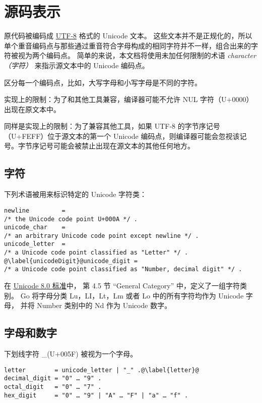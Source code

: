 
\chapter{源码表示}
原代码被编码成 \href{http://en.wikipedia.org/wiki/UTF-8}{UTF-8} 格式的 Unicode 文本。
这些文本并不是正规化的，所以单个重音编码点与那些通过重音符合字母构成的相同字符并不一样，组合出来的字符被视为两个编码点。
简单的来说，本文档将使用未加任何限制的术语 \emph{character（字符）} 来指示源文本中的 Unicode 编码点。

区分每一个编码点，比如，大写字母和小写字母是不同的字符。

实现上的限制：为了和其他工具兼容，编译器可能不允许 NUL 字符（U+0000）出现在原文本中。

同样是实现上的限制：为了兼容其他工具，如果 UTF-8 的字节序记号（U+FEFF）位于源文本的第一个 Unicode 编码点，则编译器可能会忽视该记号。字节序记号可能会被禁止出现在源文本的其他任何地方。

\section{字符}
下列术语被用来标识特定的 Unicode 字符类：
\begin{lstlisting}[style=EBNF]
newline			= 
/* the Unicode code point U+000A */ .
unicode_char	=
/* an arbitrary Unicode code point except newline */ .
unicode_letter	= 
/* a Unicode code point classified as "Letter" */ .
@\label{unicodeDigit}@unicode_digit	= 
/* a Unicode code point classified as "Number, decimal digit" */ .
\end{lstlisting}
在 \href{http://www.unicode.org/versions/Unicode8.0.0/}{Unicode 8.0 标准}中，
第 4.5 节 ``General Category'' 中，定义了一组字符类别。
Go 将字母分类 Lu，LI，Lt，Lm 或者 Lo 中的所有字符均作为 Unicode 字母，
并将 Number 类别中的 Nd 作为 Unicode 数字。

\section{字母和数字}
下划线字符 \_(U+005F) 被视为一个字母。
\begin{lstlisting}[style=EBNF]
letter        = unicode_letter | "_" .@\label{letter}@
decimal_digit = "0" … "9" .
octal_digit   = "0" … "7" .
hex_digit     = "0" … "9" | "A" … "F" | "a" … "f" .
\end{lstlisting}




